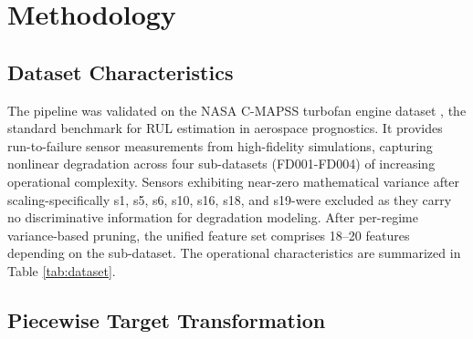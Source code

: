 \documentclass[conference]{IEEEtran}
\begin{document}
\section{Methodology}

\subsection{Dataset Characteristics}

The pipeline was validated on the NASA C-MAPSS turbofan engine dataset \cite{b13}, the standard benchmark for RUL estimation in aerospace prognostics. It provides run-to-failure sensor measurements from high-fidelity simulations, capturing nonlinear degradation across four sub-datasets (FD001-FD004) of increasing operational complexity. Sensors exhibiting near-zero mathematical variance after scaling-specifically s1, s5, s6, s10, s16, s18, and s19-were excluded as they carry no discriminative information for degradation modeling. After per-regime variance-based pruning, the unified feature set comprises 18--20 features depending on the sub-dataset. The operational characteristics are summarized in Table \ref{tab:dataset}.

\begin{table}[htbp]
\caption{C-MAPSS Dataset Operational Complexity}
\begin{center}
\end{center}
\label{tab:dataset}
\end{table}

\subsection{Piecewise Target Transformation}
\end{document}
